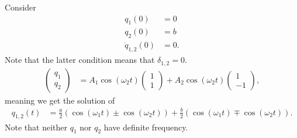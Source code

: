 \documentclass[10pt]{mypackage}
\begin{document}
\begin{example}
  Consider
  \begin{align*}
    q_1(0) &= 0\\
    q_2(0) &= b\\
    \dot{q}_{1,2}(0) &= 0.
  \end{align*}
  Note that the latter condition means that $\delta_{1,2} = 0$. 
  \begin{align*}
    \begin{pmatrix}q_1\\q_2\end{pmatrix} &= A_1\cos\left(\omega_2 t\right) \begin{pmatrix}1\\1\end{pmatrix} + A_2\cos\left(\omega_2 t\right) \begin{pmatrix}1\\-1\end{pmatrix},
  \end{align*}
  meaning we get the solution of
  \begin{align*}
    q_{1,2}(t) &= \frac{a}{2} \left(\cos\left(\omega_1 t\right) \pm \cos\left(\omega_2 t\right)\right) + \frac{b}{2} \left(\cos\left(\omega_1 t\right) \mp \cos\left(\omega_2 t\right)\right).
  \end{align*}
  Note that neither $q_1$ nor $q_2$ have definite frequency.
\end{example}
\end{document}

